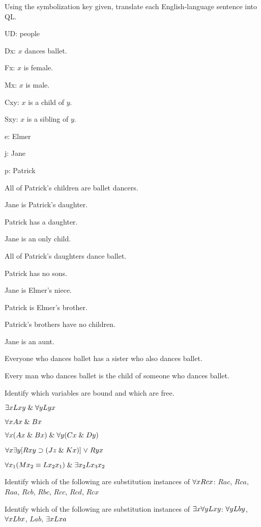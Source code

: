 \solutions
\problempart
\label{pr.QLballet}
Using the symbolization key given, translate each English-language sentence into QL.
\begin{ekey}
\item[UD:] people
\item[Dx:] $x$ dances ballet.
\item[Fx:] $x$ is female.
\item[Mx:] $x$ is male.
\item[Cxy:] $x$ is a child of $y$.
\item[Sxy:] $x$ is a sibling of $y$.
\item[e:] Elmer
\item[j:] Jane
\item[p:] Patrick
\end{ekey}
\begin{earg}
\item All of Patrick's children are ballet dancers.
\item Jane is Patrick's daughter.
\item Patrick has a daughter.
\item Jane is an only child.
\item All of Patrick's daughters dance ballet.
\item Patrick has no sons.
\item Jane is Elmer's niece.
\item Patrick is Elmer's brother.
\item Patrick's brothers have no children.
\item Jane is an aunt.
\item Everyone who dances ballet has a sister who also dances ballet.
\item Every man who dances ballet is the child of someone who dances ballet.
\end{earg}

\problempart
\label{pr.freeQL}
Identify which variables are bound and which are free.
\begin{earg}
\item $\exists x Lxy \mathrel\& \forall y Lyx$
\item $\forall x Ax \mathrel\& Bx$
\item $\forall x (Ax \mathrel\& Bx) \mathrel\& \forall y(Cx \mathrel\& Dy)$
\item $\forall x\exists y[Rxy \supset (Jz \mathrel\& Kx)] \mkern1mu\vee\mkern1mu Ryx$
\item $\forall x_1(Mx_2 \equiv Lx_2x_1) \mathrel\& \exists x_2 Lx_3x_2$
\end{earg}

\solutions
\problempart
\label{pr.subinstanceQL}
\begin{earg}
\item Identify which of the following are substitution instances of $\forall x Rcx$: $Rac$, $Rca$, $Raa$, $Rcb$, $Rbc$, $Rcc$, $Rcd$, $Rcx$
\item Identify which of the following are substitution instances of $\exists x\forall y Lxy$:
$\forall y Lby$, $\forall x Lbx$, $Lab$, $\exists x Lxa$
\end{earg}


\fi
